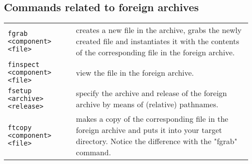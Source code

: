 \subsection{Commands related to foreign archives}
\begin{tabular}{l p{7.7cm}}
\verb+fgrab <component> <file>+        & creates a new file in the archive, 
grabs the 
                                  newly created file and instantiates it with 
                                  the contents of the corresponding file
                                  in the foreign archive. \\     
\verb+finspect <component> <file>+     & view the file in the foreign archive.\\
\verb+fsetup <archive> <release>+    & specify the archive and release of the foreign
                                  archive by means of (relative) pathnames.\\
\verb+ftcopy <component> <file>+       & makes a copy of the corresponding file in the
                                  foreign archive and puts it into your target
                                  directory. Notice the difference with the
                                  "fgrab" command.\\
\end{tabular}
